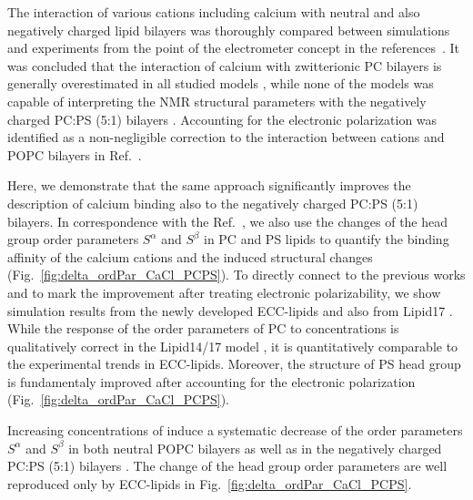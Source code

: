 \documentclass[journal=jpcbfk,manuscript=article]{achemso}
\begin{document}
The interaction of various cations including calcium 
with  neutral and also negatively charged lipid bilayers
was thoroughly compared between simulations and experiments 
from the point of the electrometer concept \cite{roux90, seelig87, altenbach84}
in the references~. 
It was concluded that the interaction of calcium with zwitterionic PC bilayers 
is generally overestimated in all studied models \cite{catte16},
while none of the models was capable of interpreting the NMR structural parameters
with the negatively charged PC:PS (5:1) bilayers \cite{nmrlipids_proj4}. 
Accounting for the electronic polarization was identified as 
a non-negligible correction to the interaction between cations and POPC bilayers in Ref.~\cite{melcr18}. 

Here, we demonstrate that the same approach 
significantly improves the description of calcium binding 
also to the negatively charged PC:PS (5:1) bilayers. 
In correspondence with the Ref.~,
we also use the changes of the head group order parameters $S^\alpha$ and $S^\beta$ 
in PC and PS lipids 
to quantify the binding affinity of the calcium cations
and the induced structural changes
(Fig.~\ref{fig:delta_ordPar_CaCl_PCPS}). 
To directly connect to the previous works \citep{catte16, nmrlipids_proj4}
and to mark the improvement after treating electronic polarizability, 
we show simulation results from the newly developed ECC-lipids and also from Lipid17 \citep{lipid17-future}. 
While the response of the order parameters of PC to  concentrations
is qualitatively correct in the Lipid14/17 model \cite{lipid17},
it is quantitatively comparable to the experimental trends in ECC-lipids. 
Moreover, the structure of PS head group is fundamentaly improved
after accounting for the electronic polarization 
(Fig.~\ref{fig:delta_ordPar_CaCl_PCPS}). 


Increasing concentrations of  
induce a systematic decrease of the order parameters $S^\alpha$ and $S^\beta$ 
in both neutral POPC bilayers \cite{catte16, melcr18}
as well as in the negatively charged PC:PS (5:1) bilayers \cite{nmrlipids_proj4, roux90}. 
The change of the head group order parameters 
are well reproduced only by ECC-lipids in Fig.~\ref{fig:delta_ordPar_CaCl_PCPS}. 
\end{document}
